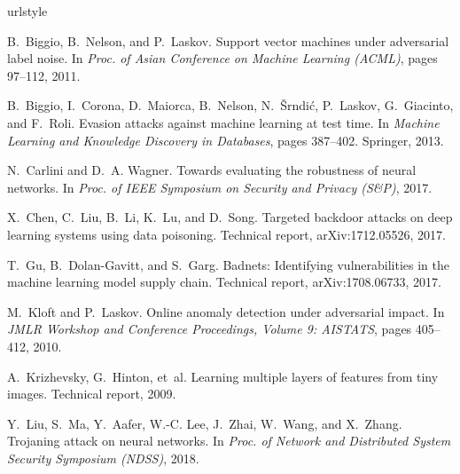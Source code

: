 \documentclass[conference]{IEEEtran}
\begin{document}
\footnotesize{

\balance

\begin{thebibliography}{21}
	\providecommand{\natexlab}[1]{#1}
	\providecommand{\url}[1]{\texttt{#1}}
	\expandafter\ifx\csname urlstyle\endcsname\relax
	\providecommand{\doi}[1]{doi: #1}\else
	\providecommand{\doi}{doi: \begingroup \urlstyle{rm}\Url}\fi
	
	B.~Biggio, B.~Nelson, and P.~Laskov.
	\newblock Support vector machines under adversarial label noise.
	\newblock In \emph{Proc. of Asian Conference on Machine Learning 
	{(ACML)}},
	pages 97--112, 2011.
	
	B.~Biggio, I.~Corona, D.~Maiorca, B.~Nelson, N.~{\v{S}}rndi{\'{c}}, 
	P.~Laskov,
	G.~Giacinto, and F.~Roli.
	\newblock Evasion attacks against machine learning at test time.
	\newblock In \emph{Machine Learning and Knowledge Discovery in 
	Databases},
	pages 387--402. Springer, 2013.
	
	N.~Carlini and D.~A. Wagner.
	\newblock Towards evaluating the robustness of neural networks.
	\newblock In \emph{Proc. of {IEEE} Symposium on Security and 
	Privacy ({S\&P})},
	2017.
	
	X.~Chen, C.~Liu, B.~Li, K.~Lu, and D.~Song.
	\newblock Targeted backdoor attacks on deep learning systems using 
	data
	poisoning.
	\newblock Technical report, arXiv:1712.05526, 2017.
	
	T.~Gu, B.~Dolan{-}Gavitt, and S.~Garg.
	\newblock Badnets: Identifying vulnerabilities in the machine 
	learning model
	supply chain.
	\newblock Technical report, arXiv:1708.06733, 2017.
	
	M.~Kloft and P.~Laskov.
	\newblock Online anomaly detection under adversarial impact.
	\newblock In \emph{JMLR Workshop and Conference Proceedings, Volume 
	9:
		AISTATS}, pages 405--412, 2010.
	
	A.~Krizhevsky, G.~Hinton, et~al.
	\newblock Learning multiple layers of features from tiny images.
	\newblock Technical report, 2009.
	
	Y.~Liu, S.~Ma, Y.~Aafer, W.-C. Lee, J.~Zhai, W.~Wang, and X.~Zhang.
	\newblock Trojaning attack on neural networks.
	\newblock In \emph{Proc. of Network and Distributed System Security 
	Symposium
		({NDSS})}, 2018.
	

\end{thebibliography}}
\end{document}
